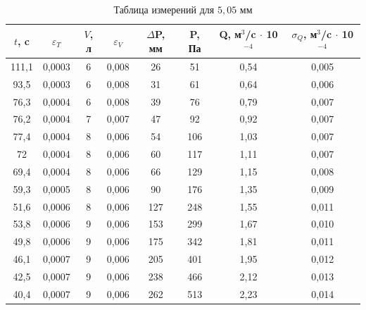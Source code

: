 \documentclass[a4paper, 12pt]{article}
\begin{document}
\begin{table}[!ht]
    \centering
    \begin{tabular}{|c|c|c|c|c|c|c|c|}
    \hline
    $t$, c & $\varepsilon_T$ & $V$, л & $\varepsilon_V$ & $\Delta$P, мм & P, Па & Q, м$^3$/c $\cdot$ 10$^{-4}$ & $\sigma_Q$, м$^3$/c $\cdot$ 10$^{-4}$ \\ \hline
    111,1 & 0,0003 & 6 & 0,008 & 26 & 51 & 0,54 & 0,005 \\ \hline
    93,5 & 0,0003 & 6 & 0,008 & 31 & 61 & 0,64 & 0,006 \\ \hline
    76,3 & 0,0004 & 6 & 0,008 & 39 & 76 & 0,79 & 0,007 \\ \hline
    76,2 & 0,0004 & 7 & 0,007 & 47 & 92 & 0,92 & 0,007 \\ \hline
    77,4 & 0,0004 & 8 & 0,006 & 54 & 106 & 1,03 & 0,007 \\ \hline
    72 & 0,0004 & 8 & 0,006 & 60 & 117 & 1,11 & 0,007 \\ \hline
    69,4 & 0,0004 & 8 & 0,006 & 66 & 129 & 1,15 & 0,008 \\ \hline
    59,3 & 0,0005 & 8 & 0,006 & 90 & 176 & 1,35 & 0,009 \\ \hline
    51,6 & 0,0006 & 8 & 0,006 & 127 & 248 & 1,55 & 0,011 \\ \hline
    53,8 & 0,0006 & 9 & 0,006 & 153 & 299 & 1,67 & 0,010 \\ \hline
    49,8 & 0,0006 & 9 & 0,006 & 175 & 342 & 1,81 & 0,011 \\ \hline
    46,1 & 0,0007 & 9 & 0,006 & 205 & 401 & 1,95 & 0,012 \\ \hline
    42,5 & 0,0007 & 9 & 0,006 & 238 & 466 & 2,12 & 0,013 \\ \hline
    40,4 & 0,0007 & 9 & 0,006 & 262 & 513 & 2,23 & 0,014 \\ \hline
    \end{tabular}
    \caption{Таблица измерений для $5,05$ мм }
\end{table}

\newpage
\end{document}

